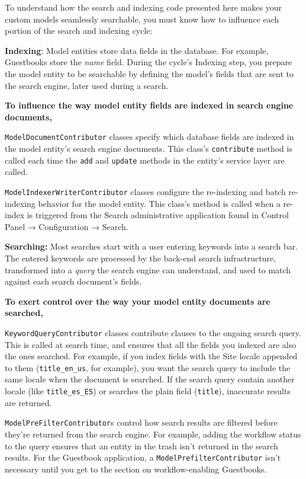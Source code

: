 To understand how the search and indexing code presented here makes your
custom models seamlessly searchable, you must know how to influence each
portion of the search and indexing cycle:

\textbf{Indexing}: Model entities store data fields in the database. For
example, Guestbooks store the \emph{name} field. During the cycle's
Indexing step, you prepare the model entity to be searchable by defining
the model's fields that are sent to the search engine, later used during
a search.

\textbf{To influence the way model entity fields are indexed in search
engine documents,}

\texttt{ModelDocumentContributor} classes specify which database fields
are indexed in the model entity's search engine documents. This class's
\texttt{contribute} method is called each time the \texttt{add} and
\texttt{update} methods in the entity's service layer are called.

\texttt{ModelIndexerWriterContributor} classes configure the re-indexing
and batch re-indexing behavior for the model entity. This class's method
is called when a re-index is triggered from the Search administrative
application found in Control Panel → Configuration → Search.

\textbf{Searching:} Most searches start with a user entering keywords
into a search bar. The entered keywords are processed by the back-end
search infrastructure, transformed into a \emph{query} the search engine
can understand, and used to match against each search document's fields.

\textbf{To exert control over the way your model entity documents are
searched,}

\texttt{KeywordQueryContributor} classes contribute clauses to the
ongoing search query. This is called at search time, and ensures that
all the fields you indexed are also the ones searched. For example, if
you index fields with the Site locale appended to them
(\texttt{title\_en\_us}, for example), you want the search query to
include the same locale when the document is searched. If the search
query contain another locale (like \texttt{title\_es\_ES}) or searches
the plain field (\texttt{title}), inaccurate results are returned.

\texttt{ModelPreFilterContributor}s control how search results are
filtered before they're returned from the search engine. For example,
adding the workflow status to the query ensures that an entity in the
trash isn't returned in the search results. For the Guestbook
application, a \texttt{ModelPrefilterContributor} isn't necessary until
you get to the section on workflow-enabling Guestbooks.

